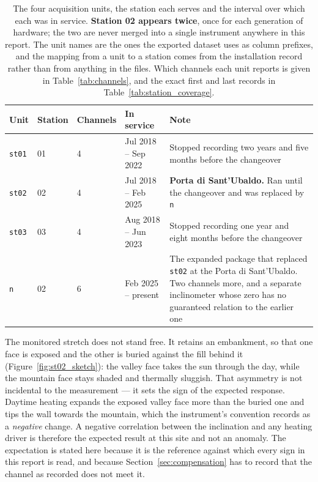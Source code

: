 \documentclass[11pt,a4paper]{article}
\begin{document}
\begin{table}[H]
\centering
\small
\begin{tabularx}{\textwidth}{L{1.5cm}L{1.5cm}L{1.5cm}L{2.9cm}Y}
\toprule
\textbf{Unit} & \textbf{Station} & \textbf{Channels} & \textbf{In service} & \textbf{Note} \\
\midrule
\texttt{st01} & 01 & 4 & Jul 2018 -- Sep 2022 &
Stopped recording two years and five months before the changeover \\
\texttt{st02} & 02 & 4 & Jul 2018 -- Feb 2025 &
\textbf{Porta di Sant'Ubaldo.} Ran until the changeover and was replaced by
\texttt{n} \\
\texttt{st03} & 03 & 4 & Aug 2018 -- Jun 2023 &
Stopped recording one year and eight months before the changeover \\
\addlinespace
\texttt{n} & 02 & 6 & Feb 2025 -- present &
The expanded package that replaced \texttt{st02} at the Porta di
Sant'Ubaldo. Two channels more, and a separate inclinometer whose zero has no
guaranteed relation to the earlier one \\
\bottomrule
\end{tabularx}
\caption{The four acquisition units, the station each serves and the interval over which each was in service. \textbf{Station 02 appears twice}, once for each generation of hardware; the two are never merged into a single instrument anywhere in this report. The unit names are the ones the exported dataset uses as column prefixes, and the mapping from a unit to a station comes from the installation record rather than from anything in the files. Which channels each unit reports is given in Table~\ref{tab:channels}, and the exact first and last records in Table~\ref{tab:station_coverage}.}
\label{tab:blocks}
\end{table}

The monitored stretch does not stand free. It retains an embankment, so that one face is exposed and the other is buried against the fill behind it (Figure~\ref{fig:st02_sketch}): the valley face takes the sun through the day, while the mountain face stays shaded and thermally sluggish. That asymmetry is not incidental to the measurement --- it sets the sign of the expected response. Daytime heating expands the exposed valley face more than the buried one and tips the wall towards the mountain, which the instrument's convention records as a \emph{negative} change. A negative correlation between the inclination and any heating driver is therefore the expected result at this site and not an anomaly. The expectation is stated here because it is the reference against which every sign in this report is read, and because Section~\ref{sec:compensation} has to record that the channel as recorded does not meet it.
\end{document}
